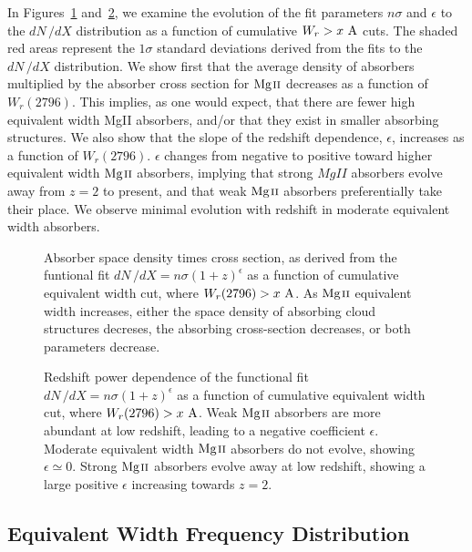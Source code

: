 \documentclass[iop,apj,numberedappendix,appendixfloats,twocolappendix]{emulateapj}
\begin{document}
In Figures~\ref{fig:nsigma} and~\ref{fig:epsilon}, we examine the evolution of the fit parameters $n\sigma$ and $\epsilon$ to the $dN\,/dX$ distribution as a function of cumulative $W_r > x~\mathrm{\AA}$ cuts. The shaded red areas represent the $1\sigma$ standard deviations derived from the fits to the $dN\,/dX$ distribution. We show first that the average density of absorbers multiplied by the absorber cross section for ${\hbox{{\rm Mg}\kern 0.1em{\sc ii}}}$ decreases as a function of $W_r(2796)$. This implies, as one would expect, that there are fewer high equivalent width MgII absorbers, and/or that they exist in smaller absorbing structures. We also show that the slope of the redshift dependence, $\epsilon$, increases as a function of $W_r(2796)$. $\epsilon$ changes from negative to positive toward higher equivalent width ${\hbox{{\rm Mg}\kern 0.1em{\sc ii}}}$ absorbers, implying that strong ${MgII}$ absorbers evolve away from $z = 2$ to present, and that weak ${\hbox{{\rm Mg}\kern 0.1em{\sc ii}}}$ absorbers preferentially take their place. We observe minimal evolution with redshift in moderate equivalent width absorbers.

\begin{figure}[bth]
\caption{Absorber space density times cross section, as derived from the funtional fit $dN\,/dX = n\sigma (1 + z)^{\epsilon}$ as a function of cumulative equivalent width cut, where $W_r(2796) > x~\mathrm{\AA}$. As ${\hbox{{\rm Mg}\kern 0.1em{\sc ii}}}$ equivalent width increases, either the space density of absorbing cloud structures decreses, the absorbing cross-section decreases, or both parameters decrease.}
\label{fig:nsigma}
\end{figure}

\begin{figure}[bth]
\caption{Redshift power dependence of the functional fit $dN\,/dX = n\sigma (1 + z)^{\epsilon}$ as a function of cumulative equivalent width cut, where $W_r(2796) > x~\mathrm{\AA}$. Weak ${\hbox{{\rm Mg}\kern 0.1em{\sc ii}}}$ absorbers are more abundant at low redshift, leading to a negative coefficient $\epsilon$. Moderate equivalent width ${\hbox{{\rm Mg}\kern 0.1em{\sc ii}}}$ absorbers do not evolve, showing $\epsilon \simeq 0$. Strong ${\hbox{{\rm Mg}\kern 0.1em{\sc ii}}}$ absorbers evolve away at low redshift, showing a large positive $\epsilon$ increasing towards $z = 2$.}
\label{fig:epsilon}
\end{figure}

\subsection{Equivalent Width Frequency Distribution}
\label{sec:ewdistro}
\end{document}
